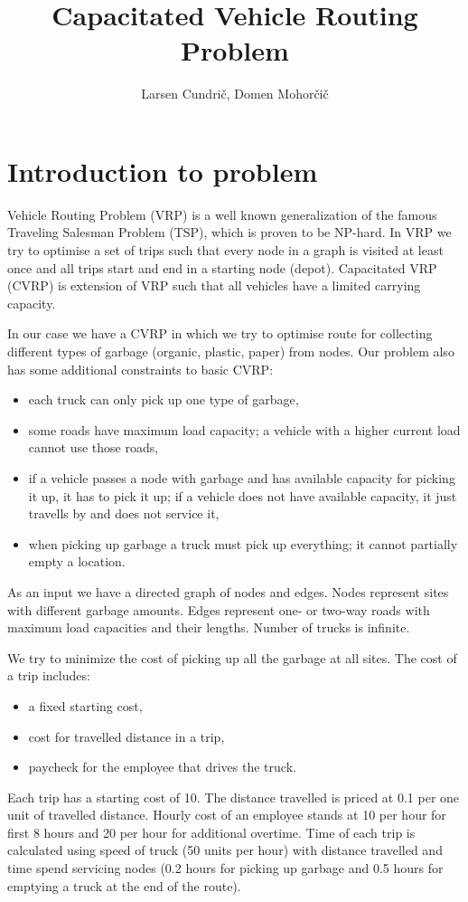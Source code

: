 \documentclass[a4paper, 12pt]{article}
\begin{document}
\title{Capacitated Vehicle Routing Problem}
\author{Larsen Cundrič, Domen Mohorčič}
\maketitle

\section{Introduction to problem}

Vehicle Routing Problem (VRP) is a well known generalization of the famous
Traveling Salesman Problem (TSP), which is proven to be NP-hard. In VRP we try
to optimise a set of trips such that every node in a graph is visited at least
once and all trips start and end in a starting node (depot).
Capacitated VRP (CVRP) is extension of VRP such that all vehicles have a
limited carrying capacity.

In our case we have a CVRP in which we try to optimise route for collecting
different types of garbage (organic, plastic, paper) from nodes. Our problem
also has some additional constraints to basic CVRP:
\begin{itemize}
	\item each truck can only pick up one type of garbage,
	\item some roads have maximum load capacity; a vehicle with a higher
		current load cannot use those roads,
	\item if a vehicle passes a node with garbage and has available capacity
		for picking it up, it has to pick it up; if a vehicle does not have
		available capacity, it just travells by and does not service it,
	\item when picking up garbage a truck must pick up everything; it cannot
		partially empty a location.
\end{itemize}
As an input we have a directed graph of nodes and edges. Nodes represent sites
with different garbage amounts. Edges represent one- or two-way roads with
maximum load capacities and their lengths. Number of trucks is infinite.

We try to minimize the cost of picking up all the garbage at all sites. The
cost of a trip includes:
\begin{itemize}
	\item a fixed starting cost,
	\item cost for travelled distance in a trip,
	\item paycheck for the employee that drives the truck.
\end{itemize}
Each trip has a starting cost of 10. The distance travelled is priced at 0.1
per one unit of travelled distance. Hourly cost of an employee stands at 10 per
hour for first 8 hours and 20 per hour for additional overtime. Time of each
trip is calculated using speed of truck (50 units per hour) with distance
travelled and time spend servicing nodes (0.2 hours for picking up garbage and
0.5 hours for emptying a truck at the end of the route).
\end{document}
